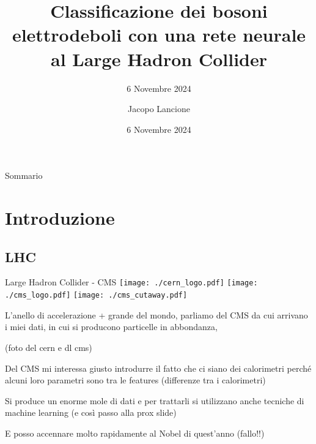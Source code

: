 \documentclass{beamer}
\title{Classificazione dei bosoni elettrodeboli con una rete neurale al Large Hadron Collider}
\subtitle{6 Novembre 2024}
\date{6 Novembre 2024}
\author{Jacopo Lancione}
\begin{document}
\begin{frame}
    \titlepage
\end{frame}

\begin{frame}{Sommario}
    \tableofcontents
\end{frame}


\section{Introduzione}
\subsection{LHC}
\begin{frame}{Large Hadron Collider - CMS}
  \texttt{[image: ./cern\_logo.pdf]}
  \texttt{[image: ./cms\_logo.pdf]}
  \texttt{[image: ./cms\_cutaway.pdf]}

  {\scriptsize
  L'anello di accelerazione + grande del mondo, parliamo del CMS da cui arrivano i miei dati, in cui si producono particelle in abbondanza,

  (foto del cern e dl cms)

  Del CMS mi interessa giusto introdurre il fatto che ci siano dei calorimetri perché alcuni loro parametri sono tra le features (differenze tra i calorimetri)

  Si produce un enorme mole di dati e per trattarli si utilizzano anche tecniche di machine learning (e così passo alla prox slide)

  E posso accennare molto rapidamente al Nobel di quest'anno (fallo!!)
  }
\end{frame}
\end{document}
